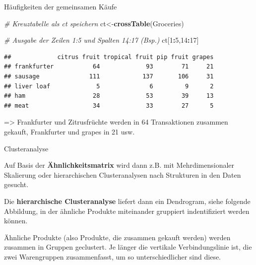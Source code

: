 \documentclass[12pt,ngerman,a4paper,ignorenonframetext,]{beamer}
\newenvironment{Shaded}{\begin{snugshade}}{\end{snugshade}}
\newcommand{\CommentTok}[1]{\textcolor[rgb]{0.56,0.35,0.01}{\textit{#1}}}
\newcommand{\DecValTok}[1]{\textcolor[rgb]{0.00,0.00,0.81}{#1}}
\newcommand{\KeywordTok}[1]{\textcolor[rgb]{0.13,0.29,0.53}{\textbf{#1}}}
\newcommand{\NormalTok}[1]{#1}
\newcommand{\OperatorTok}[1]{\textcolor[rgb]{0.81,0.36,0.00}{\textbf{#1}}}
\begin{document}
\begin{frame}{Häufigkeiten der gemeinsamen Käufe}
\protect\hypertarget{haufigkeiten-der-gemeinsamen-kaufe}{}

\begin{Shaded}
\begin{Highlighting}[]
\CommentTok{# Kreuztabelle als ct speichern}
\NormalTok{ct<-}\KeywordTok{crossTable}\NormalTok{(Groceries)}

\CommentTok{# Ausgabe der Zeilen 1:5 und Spalten 14:17 (Bsp.)}
\NormalTok{ct[}\DecValTok{1}\OperatorTok{:}\DecValTok{5}\NormalTok{,}\DecValTok{14}\OperatorTok{:}\DecValTok{17}\NormalTok{]}
\end{Highlighting}
\end{Shaded}

\begin{verbatim}
##             citrus fruit tropical fruit pip fruit grapes
## frankfurter           64             93        71     21
## sausage              111            137       106     31
## liver loaf             5              6         9      2
## ham                   28             53        39     13
## meat                  34             33        27      5
\end{verbatim}

=\textgreater{} Frankfurter und Zitrusfrüchte werden in 64 Transaktionen
zusammen gekauft, Frankfurter und grapes in 21 usw.

\end{frame}

\begin{frame}{Clusteranalyse}
\protect\hypertarget{clusteranalyse}{}

Auf Basis der \textbf{Ähnlichkeitsmatrix} wird dann
\mbox{z.\thinspace{}B.}\xspace{} mit Mehrdimensionaler Skalierung oder
hierarchischen Clusteranalysen nach Strukturen in den Daten gesucht.

Die \textbf{hierarchische Clusteranalyse} liefert dann ein Dendrogram,
siehe folgende Abbildung, in der ähnliche Produkte miteinander gruppiert
indentifiziert werden können.

Ähnliche Produkte (also Produkte, die zusammen gekauft werden) werden
zusammen in Gruppen geclustert. Je länger die vertikale Verbindungslinie
ist, die zwei Warengruppen zusammenfasst, um so unterschiedlicher sind
diese.

\end{frame}
\end{document}
